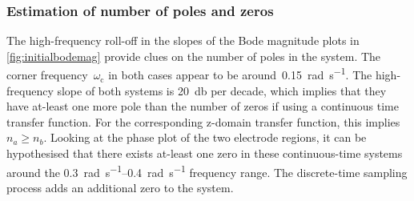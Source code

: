 

\subsubsection*{Estimation of number of poles and zeros}

The  high-frequency  roll-off  in  the   slopes  of  the  Bode  magnitude  plots
in  \cref{fig:initialbodemag}  provide clues  on  the  number  of poles  in  the
system.  The  corner frequency~$\omega_\text{c}$  in  both  cases appear  to  be
around~\SI{0.15}{\radian\per\second}. The  high-frequency slope of  both systems
is \approx\SI{20}{\decibel}  per decade, which  implies that they  have at-least
one more  pole than  the number  of zeros  if using  a continuous  time transfer
function. For  the corresponding z-domain  transfer function, this  implies $n_a
\ge n_b$. Looking at the phase plot of the two electrode regions, it can be
hypothesised that there exists at-least one zero in these  continuous-time
systems around the \SIrange{0.3}{0.4}{\radian\per\second} frequency range. The
discrete-time sampling process adds an additional zero to the system.

